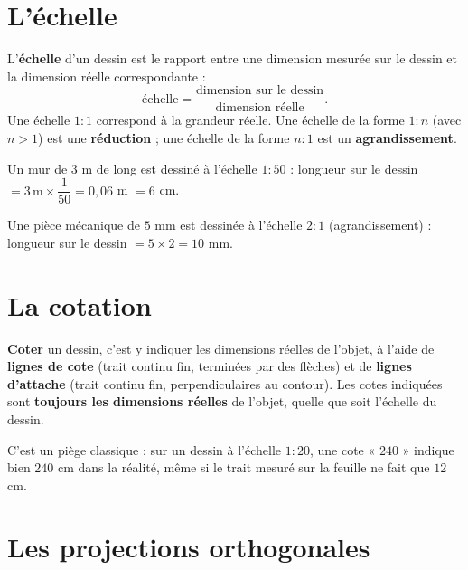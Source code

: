 \section{L'échelle}

\begin{definition}[Échelle]
L'\textbf{échelle} d'un dessin est le rapport entre une dimension mesurée sur le dessin
et la dimension réelle correspondante :
\[
\text{échelle}=\frac{\text{dimension sur le dessin}}{\text{dimension réelle}}.
\]
Une échelle \textbf{$1{:}1$} correspond à la grandeur réelle. Une échelle de la forme
\textbf{$1{:}n$} (avec $n>1$) est une \textbf{réduction} ; une échelle de la forme
\textbf{$n{:}1$} est un \textbf{agrandissement}.
\end{definition}

\begin{exemple}
Un mur de $3$ m de long est dessiné à l'échelle $1{:}50$ : longueur sur le dessin
$=3\,\text{m}\times\dfrac1{50}=0{,}06$ m $=6$ cm.
\end{exemple}

\begin{exemple}
Une pièce mécanique de $5$ mm est dessinée à l'échelle $2{:}1$ (agrandissement) :
longueur sur le dessin $=5\times2=10$ mm.
\end{exemple}

\section{La cotation}

\begin{definition}[Cotation]
\textbf{Coter} un dessin, c'est y indiquer les dimensions réelles de l'objet, à l'aide de
\textbf{lignes de cote} (trait continu fin, terminées par des flèches) et de
\textbf{lignes d'attache} (trait continu fin, perpendiculaires au contour). Les cotes
indiquées sont \textbf{toujours les dimensions réelles} de l'objet, quelle que soit
l'échelle du dessin.
\end{definition}

\begin{remarque}
C'est un piège classique : sur un dessin à l'échelle $1{:}20$, une cote « $240$ » indique
bien $240$ cm dans la réalité, même si le trait mesuré sur la feuille ne fait que $12$
cm.
\end{remarque}

\section{Les projections orthogonales}

